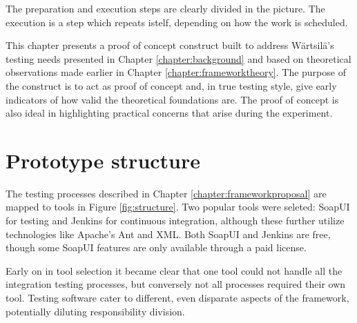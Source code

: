 \documentclass[12pt,a4paper,oneside,pdftex]{report}
\begin{document}
{\begin{comment}
\path [line] (cap) -- (rec);
\path [line] (rec) -- (gen);
\path [line] (gen) -- (cse);
\path [line] (ver) -- (upd); 
\path [line] (cse) -- (2.5,-3) -- (2.5,-8) -- (exe);
\path [dots] (upd) -- (db);
\path [line] (exe) -- (sut);
\path [line] (exe) -- (db);
\path [line] (exe) -- (col);
\path [line] (col) -- (sut);
\path [line] (col) -- (trc);
\path [line] (trc) -- (ver);

\end{tikzpicture}
\caption{Testing framework hypothesis, adapted from \citet{liu2009unified}} \label{fig:UTF}
\end{figure}
\end{comment}

The preparation and execution steps are clearly divided in the picture. The execution is a step which repeats istelf, depending on how the work is scheduled.


This chapter presents a proof of concept construct built to address Wärtsilä's testing needs presented in Chapter \ref{chapter:background} and based on theoretical observations made earlier in Chapter \ref{chapter:frameworktheory}. The purpose of the construct is to act as proof of concept and, in true testing style, give early indicators of how valid the theoretical foundations are. The proof of concept is also ideal in highlighting practical concerns that arise during the experiment.

\section{Prototype structure}


The testing processes described in Chapter \ref{chapter:frameworkproposal} are mapped to tools in Figure \ref{fig:structure}. Two popular tools were seleted: SoapUI for testing and Jenkins for continuous integration, although these further utilize technologies like Apache's Ant and XML. Both SoapUI and Jenkins are free, though some SoapUI features are only available through a paid license.

Early on in tool selection it became clear that one tool could not handle all the integration testing processes, but conversely not all processes required their own tool. Testing software cater to different, even disparate aspects of the framework, potentially diluting responsibility division.

}
\end{document}
